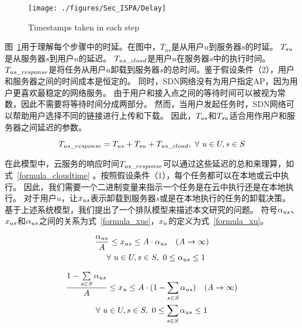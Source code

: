 \begin{figure}[!h]
  \centering
  \vspace{-1em}
  \texttt{[image: ./figures/Sec\_ISPA/Delay]}
  \vspace{-1em}
  \caption{Timestamps taken in each step}
  \vspace{-1em}
  \label{fig_timestaps}
\end{figure}

图~\ref{fig_timestaps}用于理解每个步骤中的时延。在图中，${T}_{us}$是从用户$u$到服务器$s$的时延。 ${T}_{su}$是从服务器$s$到用户$u$的延迟。 ${T}_{us\_cloud}$是用户$u$在服务器$s$中的执行时间。 ${T}_{us\_response}$是将任务从用户$u$卸载到服务器$s$的总时间。鉴于假设条件（2），用户和服务器之间的时间成本是恒定的。 同时，SDN网络没有为用户指定AP，因为用户更喜欢最稳定的网络服务。 由于用户和接入点之间的等待时间可以被视为常数，因此不需要将等待时间分成两部分。 然而，当用户发起任务时，SDN网络可以帮助用户选择不同的链接进行上传和下载。 因此，${T}_{us}$和${T}_{su}$适合用作用户和服务器之间延迟的参数。

\vspace{-1.5em}
\begin{equation}
\label{formula_cloudtime}
{T}_{us\_response} = {T}_{us} + {T}_{su} + {T}_{us\_cloud},\ \forall \ u \in U, s \in S
\end{equation}

在此模型中，云服务的响应时间${T}_{us\_response}$可以通过这些延迟的总和来理算，如式~\eqref{formula_cloudtime} 。按照假设条件（1），每个任务都可以在本地或云中执行。 因此，我们需要一个二进制变量来指示一个任务是在云中执行还是在本地执行。 对于用户$u$，让${x}_{us}$表示卸载到服务器$s$或是在本地执行的任务的卸载决策。 基于上述系统模型，我们提出了一个排队模型来描述本文研究的问题。 符号${\alpha}_{us}$、${x}_{us}$和${\alpha}_{us}$之间的关系为式~\eqref{formula_xus}，${x}_{u}$的定义为式~\eqref{formula_xu}。

\begin{equation}
  \label{formula_xus}
  \begin{gathered}
  \frac{{\alpha}_{us}}{A} \leq {x}_{us} \leq A \cdot {\alpha}_{us} \quad (A \to \infty) \\
  \quad \forall \ u \in U, s \in S, \ 0\leq {\alpha}_{us} \leq 1
  \end{gathered}
\end{equation}

\vspace{-0.5em}
\begin{equation}
\label{formula_xu}
\begin{gathered}
\frac{1 - \sum\limits_{s \in S}{{\alpha}_{us}}}{A} \leq {x}_{u} \leq A \cdot (1 - \sum_{s \in S}{{\alpha}_{us}}) \quad (A \to \infty) \\
\forall\ u \in U, s \in S, \ 0\leq \sum_{s \in S}{{\alpha}_{us}} \leq 1
\end{gathered}
\end{equation}

